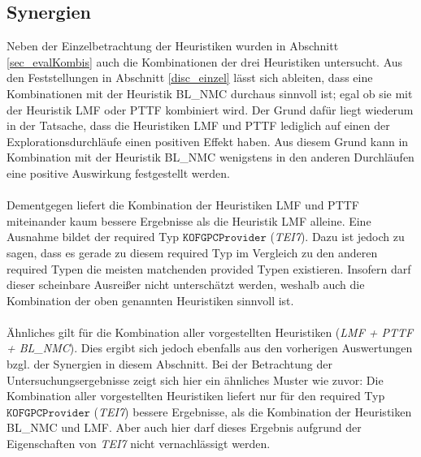 \subsection{Synergien}
Neben der Einzelbetrachtung der Heuristiken wurden in Abschnitt \ref{sec_evalKombis} auch die Kombinationen der drei Heuristiken untersucht. Aus den Feststellungen in Abschnitt \ref{disc_einzel} lässt sich ableiten, dass eine Kombinationen mit der Heuristik BL\_NMC durchaus sinnvoll ist; egal ob sie mit der Heuristik LMF oder PTTF kombiniert wird. Der Grund dafür liegt wiederum in der Tatsache, dass die Heuristiken LMF und PTTF lediglich auf einen der Explorationsdurchläufe einen positiven Effekt haben. Aus diesem Grund kann in Kombination mit der Heuristik BL\_NMC wenigstens in den anderen Durchläufen eine positive Auswirkung festgestellt werden.
\\\\
Dementgegen liefert die Kombination der Heuristiken LMF und PTTF miteinander kaum bessere Ergebnisse als die Heuristik LMF alleine. Eine Ausnahme bildet der required Typ $\texttt{KOFGPCProvider}$ (\emph{TEI7}). Dazu ist jedoch zu sagen, dass es gerade zu diesem required Typ im Vergleich zu den anderen required Typen die meisten matchenden provided Typen existieren. Insofern darf dieser scheinbare Ausreißer nicht unterschätzt werden, weshalb auch die Kombination der oben genannten Heuristiken sinnvoll ist.
\\\\
Ähnliches gilt für die Kombination aller vorgestellten Heuristiken (\emph{LMF + PTTF + BL\_NMC}). Dies ergibt sich jedoch ebenfalls aus den vorherigen Auswertungen bzgl. der Synergien in diesem Abschnitt. Bei der Betrachtung der Untersuchungsergebnisse zeigt sich hier ein ähnliches Muster wie zuvor: Die Kombination aller vorgestellten Heuristiken liefert nur für den required Typ $\texttt{KOFGPCProvider}$ (\emph{TEI7}) bessere Ergebnisse, als die Kombination der Heuristiken BL\_NMC und LMF. Aber auch hier darf dieses Ergebnis aufgrund der Eigenschaften von \emph{TEI7} nicht vernachlässigt werden.

